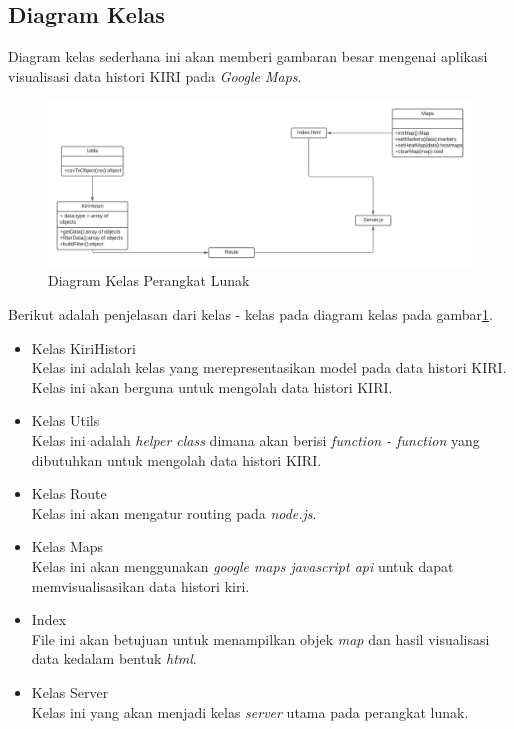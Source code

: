 \subsection{Diagram Kelas}
\label{subsec:diagramKelas}
Diagram kelas sederhana ini akan memberi gambaran besar mengenai aplikasi visualisasi data histori KIRI pada \textit{Google Maps}.


\begin{figure}[H]
	\centering  
	\includegraphics[scale=0.6]{Gambar/ClassDiagram.jpeg}  
	\caption[Diagram Kelas Perangkat Lunak]{Diagram Kelas Perangkat Lunak} 
	\label{fig:classdiagram} 
\end{figure}

Berikut adalah penjelasan dari kelas - kelas pada diagram kelas pada gambar\ref{fig:classdiagram}.
\begin{itemize}
\item Kelas KiriHistori\\
Kelas ini adalah kelas yang merepresentasikan model pada data histori KIRI. Kelas ini akan berguna untuk mengolah data histori KIRI.
\item Kelas Utils\\
Kelas ini adalah \textit{helper class} dimana akan berisi \textit{function - function} yang dibutuhkan untuk mengolah data histori KIRI.
\item Kelas Route\\
Kelas ini akan mengatur routing pada \textit{node.js}.
\item Kelas Maps\\
Kelas ini akan menggunakan \textit{google maps javascript api} untuk dapat memvisualisasikan data histori kiri.
\item Index\\
File ini akan betujuan untuk menampilkan objek \textit{map} dan hasil visualisasi data kedalam bentuk \textit{html}.
\item Kelas Server\\
Kelas ini yang akan menjadi kelas \textit{server} utama pada perangkat lunak.
\end{itemize}